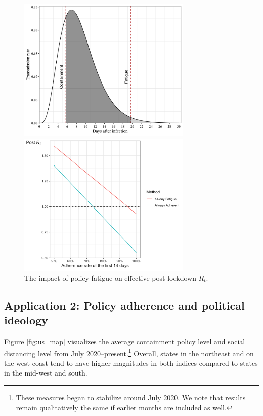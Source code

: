 \documentclass[dvipsnames]{article}
\begin{document}
\begin{figure}[htb!]
	\centering
    \centering
    \begin{minipage}[t]{0.48\textwidth}
    \centering
    \includegraphics[width=8.3cm]{R0.png}
    \end{minipage}
    \hspace{1.5em}
    \begin{minipage}[t]{0.48\textwidth}
    \centering
    \includegraphics[width=8.3cm]{postR0.png}
    \end{minipage}
	\caption{\small The impact of policy fatigue on effective post-lockdown $R_t$.}
	\label{fig:R0}
\end{figure}

\subsection{Application 2: Policy adherence and political ideology}
Figure \ref{fig:us_map} visualizes the average containment policy level and social distancing level from July 2020--present.\footnote{These measures began to stabilize around July 2020. We note that results remain qualitatively the same if earlier months are included as well.} Overall, states in the northeast and on the west coast tend to have higher magnitudes in both indices compared to states in the mid-west and south. 
\end{document}
